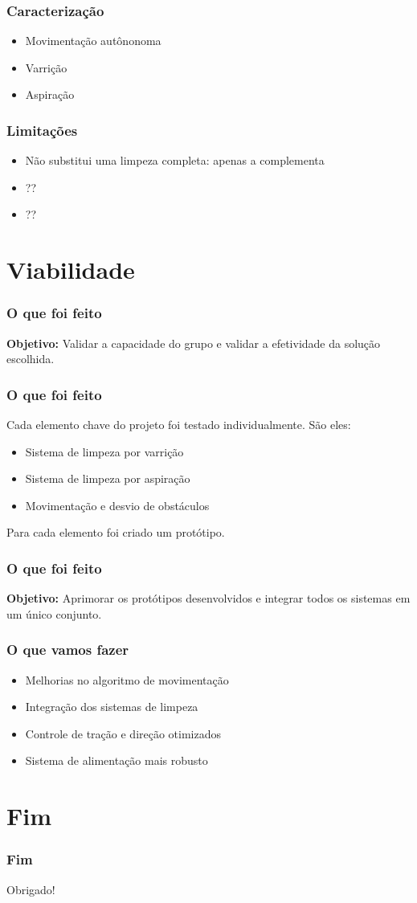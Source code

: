 \documentclass{beamer}
\begin{document}
\begin{frame}
  \frametitle{Caracterização}
  \begin{itemize}
  	\item Movimentação autônonoma
  	\item Varrição
  	\item Aspiração
  \end{itemize}
\end{frame}

\begin{frame}
  \frametitle{Limitações}
  \begin{itemize}
  	\item Não substitui uma limpeza completa: apenas a complementa
  	\item ??
  	\item ??
  \end{itemize}
\end{frame}

\section{Viabilidade}
\begin{frame}
  \frametitle{O que foi feito}
  \textbf{Objetivo:} Validar a capacidade do grupo e validar a efetividade da solução escolhida.
\end{frame}

\begin{frame}
  \frametitle{O que foi feito}
  Cada elemento chave do projeto foi testado individualmente. São eles:
  \begin{itemize}
  	\item Sistema de limpeza por varrição
  	\item Sistema de limpeza por aspiração
  	\item Movimentação e desvio de obstáculos
  \end{itemize}
  Para cada elemento foi criado um protótipo.
\end{frame}

\begin{frame}
  \frametitle{O que foi feito}
  \textbf{Objetivo:} Aprimorar os protótipos desenvolvidos e integrar todos os sistemas em um único conjunto.
\end{frame}

\begin{frame}
  \frametitle{O que vamos fazer}
  \begin{itemize}
  	\item Melhorias no algoritmo de movimentação
  	\item Integração dos sistemas de limpeza
  	\item Controle de tração e direção otimizados
  	\item Sistema de alimentação mais robusto
  \end{itemize}
\end{frame}

\section{Fim}
\begin{frame}
	\frametitle{Fim}
	Obrigado!
\end{frame}
\end{document}
